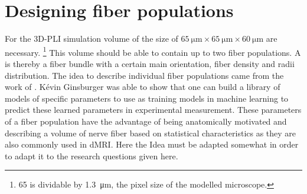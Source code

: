 \section{Designing fiber populations}
% 
For the \ac{3D-PLI} simulation volume of the size of $\SI{65}{\micro\meter} \times \SI{65}{\micro\meter} \times \SI{60}{\micro\meter}$ are necessary. \footnote{65 is dividable by \SI{1.3}{\micro\meter}, the pixel size of the modelled microscope.}
This volume should be able to contain up to two fiber populations.
A  is thereby a fiber bundle with a certain main orientation, fiber density and radii distribution.
The idea to describe individual fiber populations came from the work of \cite{Ginsburger2018, Ginsburger2019,ginsburgerDis2019}. 
K{\'{e}}vin Ginsburger was able to show that one can build a library of models of specific parameters to use as training models in machine learning to predict these learned parameters in experimental measurement.
These parameters of a fiber population have the advantage of being anatomically motivated and describing a volume of nerve fiber based on statistical characteristics as they are also commonly used in \ac{dMRI}.
Here the Idea must be adapted somewhat in order to adapt it to the research questions given here.
% 

